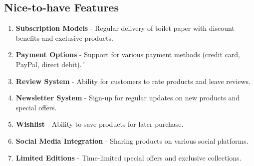 \documentclass[a4paper,11pt]{article}
\begin{document}
\subsection{Nice-to-have Features}
\begin{enumerate}[label=\textbf{NF\arabic*:}]
    \item \textbf{Subscription Models} - Regular delivery of toilet paper with discount benefits and exclusive products.
    
    \item \textbf{Payment Options} - Support for various payment methods (credit card, PayPal, direct debit).´
    \item \textbf{Review System} - Ability for customers to rate products and leave reviews.
    \item \textbf{Newsletter System} - Sign-up for regular updates on new products and special offers.
    \item \textbf{Wishlist} - Ability to save products for later purchase.
    \item \textbf{Social Media Integration} - Sharing products on various social platforms.
    \item \textbf{Limited Editions} - Time-limited special offers and exclusive collections.
\end{enumerate}
\end{document}

